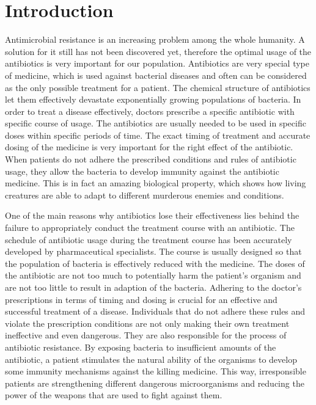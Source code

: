 \chapter*{Introduction}


Antimicrobial resistance is an increasing problem among the whole humanity. A solution for it still has not been discovered yet, therefore the optimal usage of the antibiotics is very important for our population. Antibiotics are very special type of medicine, which is used against bacterial diseases and often can be considered as the only possible treatment for a patient. The chemical structure of antibiotics let them effectively devastate exponentially growing populations of bacteria. In order to treat a disease effectively, doctors prescribe a specific antibiotic with specific course of usage. The antibiotics are usually needed to be used in specific doses within specific periods of time. The exact timing of treatment and accurate dosing of the medicine is very important for the right effect of the antibiotic. When patients do not adhere the prescribed conditions and rules of antibiotic usage, they allow the bacteria to develop immunity against the antibiotic medicine. This is in fact an amazing biological property, which shows how living creatures are able to adapt to different murderous enemies and conditions.

One of the main reasons why antibiotics lose their effectiveness lies behind the failure to appropriately conduct the treatment course with an antibiotic. The schedule of antibiotic usage during the treatment course has been accurately developed by pharmaceutical specialists. The course is usually designed so that the population of bacteria is effectively reduced with the medicine. The doses of the antibiotic are not too much to potentially harm the patient's organism and are not too little to result in adaption of the bacteria. Adhering to the doctor's prescriptions in terms of timing and dosing is crucial for an effective and successful treatment of a disease. Individuals that do not adhere these rules and violate the prescription conditions are not only making their own treatment ineffective and even dangerous. They are also responsible for the process of antibiotic resistance. By exposing bacteria to insufficient amounts of the antibiotic, a patient stimulates the natural ability of the organisms to develop some immunity mechanisms against the killing medicine. This way, irresponsible patients are strengthening different dangerous microorganisms and reducing the power of the weapons that are used to fight against them.

